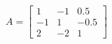 \documentclass[preview]{standalone}
\begin{document}
\begin{align*}
A = \begin{bmatrix} 1 & -1 & 0.5 \\ -1 & 1 & -0.5 \\ 2 & -2 & 1 \end{bmatrix}
\end{align*}
\end{document}

